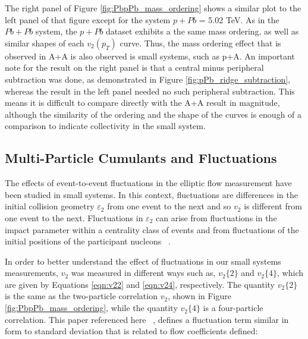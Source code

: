 The right panel of Figure \ref{fig:PbpPb_mass_ordering} shows a similar plot to the left panel of that figure except for the system $p+Pb$ \sqsn = 5.02 TeV. As in the $Pb+Pb$ system, the $p+Pb$ dataset exhibits a the same mass ordering, as well as similar shapes of each $v_2(p_T)$ curve. Thus, the mass ordering effect that is observed in A+A is also observed is small systems, such as p+A. An important note for the result on the right panel is that a central minus peripheral subtraction was done, as demonstrated in Figure \ref{fig:pPb_ridge_subtraction}, whereas the result in the left panel needed no such peripheral subtraction. This means it is difficult to compare directly with the A+A result in magnitude, although the similarity of the ordering and the shape of the curves is enough of a comparison to indicate collectivity in the small system.


\subsection{Multi-Particle Cumulants and Fluctuations}
\label{sec:cumulants_fluctua}
The effects of event-to-event fluctuations in the elliptic flow measurement have been studied in small systems. In this context, fluctuations are differences in the initial collision geometry $\varepsilon_2$ from one event to the next and so $v_2$ is different from one event to the next. Fluctuations in $\varepsilon_2$ can arise from fluctuations in the impact parameter within a centrality class of events and from fluctuations of the initial positions of the participant nucleons ~\cite{PhysRevC.80.014904}.

In order to better understand the effect of fluctuations in our small systems measurements, $v_2$ was measured in different ways such as, $v_2\{2\}$ and $v_2\{4\}$, which are given by Equations \ref{eqn:v22} and \ref{eqn:v24}, respectively. The quantity $v_2\{2\}$ is the same as the two-particle correlation $v_2$, shown in Figure \ref{fig:PbpPb_mass_ordering}, while the quantity $v_2\{4\}$ is a four-particle correlation. This paper referenced here ~\cite{PhysRevC.80.014904}, defines a fluctuation term similar in form to standard deviation that is related to flow coefficients defined:

